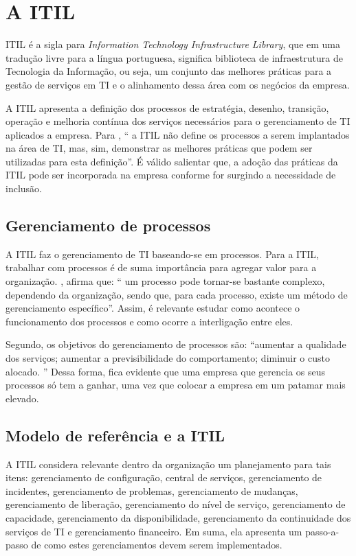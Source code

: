 \documentclass[eso]{bcc}
\begin{document}
\section{A ITIL}
ITIL é a sigla para \textit{ Information Technology Infrastructure Library}, que em uma tradução livre para a língua portuguesa, significa biblioteca de infraestrutura de Tecnologia da Informação, ou seja, um conjunto das melhores práticas para a gestão de serviços em TI e o alinhamento dessa área com os negócios da empresa.

A ITIL apresenta a definição dos processos de estratégia, desenho, transição, operação e melhoria contínua dos serviços necessários para o gerenciamento de TI aplicados a empresa. Para \cite[p.65]{magalhaes:2007}, “ a ITIL não define os processos a serem implantados na área de TI, mas, sim, demonstrar as melhores práticas que podem ser utilizadas para esta definição”.  É válido salientar que, a adoção das práticas da ITIL pode ser incorporada na empresa conforme for surgindo a necessidade de inclusão.

\subsection{Gerenciamento de processos}

A ITIL faz o gerenciamento de TI baseando-se em processos. Para a ITIL, trabalhar com processos é de suma importância para agregar valor para a organização. \cite[p.65]{magalhaes:2007}, afirma que: “ um processo pode tornar-se bastante complexo, dependendo da organização, sendo que, para cada processo, existe um método de gerenciamento específico”. Assim, é relevante estudar como acontece o funcionamento dos processos e como ocorre a interligação entre eles. 

Segundo\cite[p.65]{magalhaes:2007}, os objetivos do gerenciamento de processos são: “aumentar a qualidade dos serviços; aumentar a previsibilidade do comportamento; diminuir o custo alocado. ” Dessa forma, fica evidente que uma empresa que gerencia os seus processos só tem a ganhar, uma vez que colocar a empresa em um patamar mais elevado.

\subsection{Modelo de referência e a ITIL}

A ITIL considera relevante dentro da organização um planejamento para tais itens:  gerenciamento de configuração, central de serviços, gerenciamento de incidentes, gerenciamento de problemas, gerenciamento de mudanças, gerenciamento de liberação, gerenciamento do nível de serviço, gerenciamento de capacidade, gerenciamento da disponibilidade, gerenciamento da continuidade dos serviços de TI e gerenciamento financeiro. Em suma, ela apresenta um passo-a-passo de como estes gerenciamentos devem serem implementados.
\end{document}
